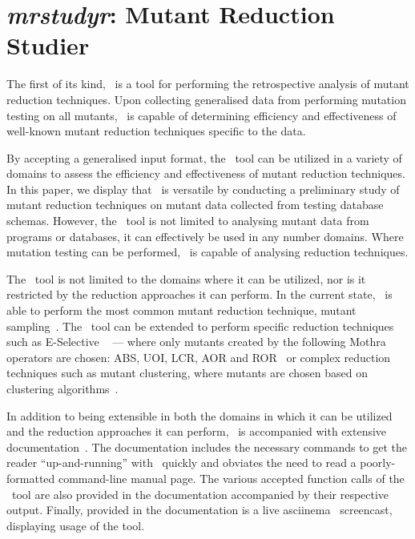 
\section{\textit{mrstudyr}: Mutant Reduction Studier}



The first of its kind, \mr~is a tool for performing the retrospective analysis
of mutant reduction techniques. Upon collecting generalised data from performing
mutation testing on all mutants, \mr~is capable of determining efficiency and
effectiveness of well-known mutant reduction techniques specific to the data.

By accepting a generalised input format, the \mr~tool can be utilized in a variety
of domains to assess the efficiency and effectiveness of mutant reduction techniques.
In this paper, we display that \mr~is versatile by conducting a preliminary study
of mutant reduction techniques on mutant data collected from testing database schemas.
However, the \mr~tool is not limited to analysing mutant data from programs or databases,
it can effectively be used in any number domains. Where mutation testing can be performed,
\mr~is capable of analysing reduction techniques.




The \mr~tool is not limited to the domains where it can be utilized, nor is it restricted
by the reduction approaches it can perform. In the current state, \mr~is able to perform
the most common mutant reduction technique, mutant sampling~\cite{gopinath2015mutation, jia2011analysis, gopinath2015empirical}.
The \mr~tool can be extended to perform specific reduction techniques such as E-Selective
~\cite{offutt1996experimental} --- where only mutants created by the following Mothra operators
are chosen: ABS, UOI, LCR, AOR and ROR~\cite{gopinath2015empirical} or complex reduction techniques
such as mutant clustering, where mutants are chosen based on clustering algorithms~\cite{jia2011analysis}.

In addition to being extensible in both the domains in which it can be utilized and the
reduction approaches it can perform, \mr~is accompanied with extensive documentation~\cite{tool}.
The documentation includes the necessary commands to get the reader ``up-and-running''
with \mr~quickly and obviates the need to read a poorly-formatted command-line manual page.
The various accepted function calls of the \mr~tool are also provided in the documentation
accompanied by their respective output. Finally, provided in the documentation is a live
asciinema~\cite{asciinema} screencast, displaying usage of the tool.

